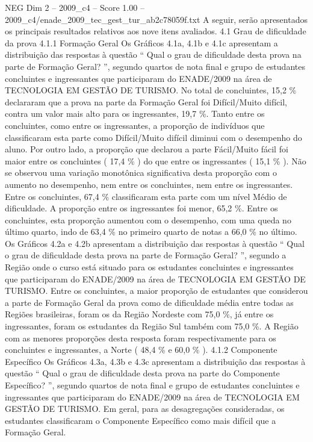 \begin{textsample}{NEG Dim 2 – 2009\_c4 – Score 1.00 – 2009\_c4/enade\_2009\_tec\_gest\_tur\_ab2c78059f.txt}
A seguir, serão apresentados os principais resultados relativos aos nove itens avaliados. 4.1 Grau de dificuldade da prova 4.1.1 Formação Geral Os Gráficos 4.1a, 4.1b e 4.1c apresentam a distribuição das respostas à questão “ Qual o grau de dificuldade desta prova na parte de Formação Geral? ”, segundo quartos de nota final e grupo de estudantes concluintes e ingressantes que participaram do ENADE/2009 na área de TECNOLOGIA EM GESTÃO DE TURISMO.
No total de concluintes, 15,2 \% declararam que a prova na parte da Formação Geral foi Difícil/Muito difícil, contra um valor mais alto para os ingressantes, 19,7 \%.
Tanto entre os concluintes, como entre os ingressantes, a proporção de indivíduos que classificaram esta parte como Difícil/Muito difícil diminui com o desempenho do aluno.
Por outro lado, a proporção que declarou a parte Fácil/Muito fácil foi maior entre os concluintes ( 17,4 \% ) do que entre os ingressantes ( 15,1 \% ).
Não se observou uma variação monotônica significativa desta proporção com o aumento no desempenho, nem entre os concluintes, nem entre os ingressantes.
Entre os concluintes, 67,4 \% classificaram esta parte com um nível Médio de dificuldade.
A proporção entre os ingressantes foi menor, 65,2 \%.
Entre os concluintes, esta proporção aumentou com o desempenho, com uma queda no último quarto, indo de 63,4 \% no primeiro quarto de notas a 66,0 \% no último.
Os Gráficos 4.2a e 4.2b apresentam a distribuição das respostas à questão “ Qual o grau de dificuldade desta prova na parte de Formação Geral? ”, segundo a Região onde o curso está situado para os estudantes concluintes e ingressantes que participaram do ENADE/2009 na área de TECNOLOGIA EM GESTÃO DE TURISMO.
Entre os concluintes, a maior proporção de estudantes que considerou a parte de Formação Geral da prova como de dificuldade média entre todas as Regiões brasileiras, foram os da Região Nordeste com 75,0 \%, já entre os ingressantes, foram os estudantes da Região Sul também com 75,0 \%.
A Região com as menores proporções desta resposta foram respectivamente para os concluintes e ingressantes, a Norte ( 48,4 \% e 60,0 \% ). 4.1.2 Componente Específico Os Gráficos 4.3a, 4.3b e 4.3c apresentam a distribuição das respostas à questão “ Qual o grau de dificuldade desta prova na parte do Componente Específico? ”, segundo quartos de nota final e grupo de estudantes concluintes e ingressantes que participaram do ENADE/2009 na área de TECNOLOGIA EM GESTÃO DE TURISMO.
Em geral, para as desagregações consideradas, os estudantes classificaram o Componente Específico como mais difícil que a Formação Geral.

\end{textsample}

